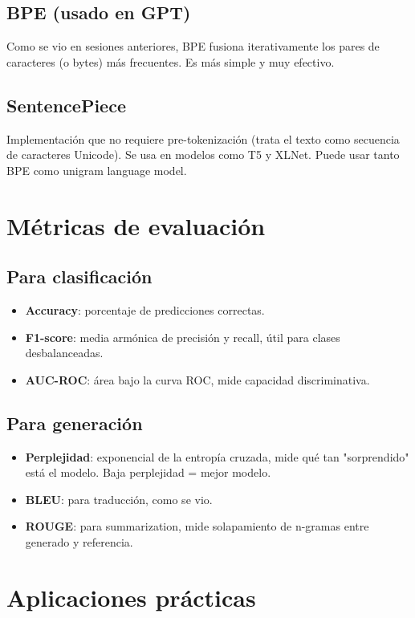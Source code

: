 \documentclass[12pt,a4paper,openany,oneside]{book}
\begin{document}
\subsection{BPE (usado en GPT)}
Como se vio en sesiones anteriores, BPE fusiona iterativamente los pares de caracteres (o bytes) más frecuentes. Es más simple y muy efectivo.

\subsection{SentencePiece}
Implementación que no requiere pre-tokenización (trata el texto como secuencia de caracteres Unicode). Se usa en modelos como T5 y XLNet. Puede usar tanto BPE como unigram language model.

\section{Métricas de evaluación}

\subsection{Para clasificación}
\begin{itemize}
    \item \textbf{Accuracy}: porcentaje de predicciones correctas.
    \item \textbf{F1-score}: media armónica de precisión y recall, útil para clases desbalanceadas.
    \item \textbf{AUC-ROC}: área bajo la curva ROC, mide capacidad discriminativa.
\end{itemize}

\subsection{Para generación}
\begin{itemize}
    \item \textbf{Perplejidad}: exponencial de la entropía cruzada, mide qué tan "sorprendido" está el modelo. Baja perplejidad = mejor modelo.
    \item \textbf{BLEU}: para traducción, como se vio.
    \item \textbf{ROUGE}: para summarization, mide solapamiento de n-gramas entre generado y referencia.
\end{itemize}

\section{Aplicaciones prácticas}
\end{document}
